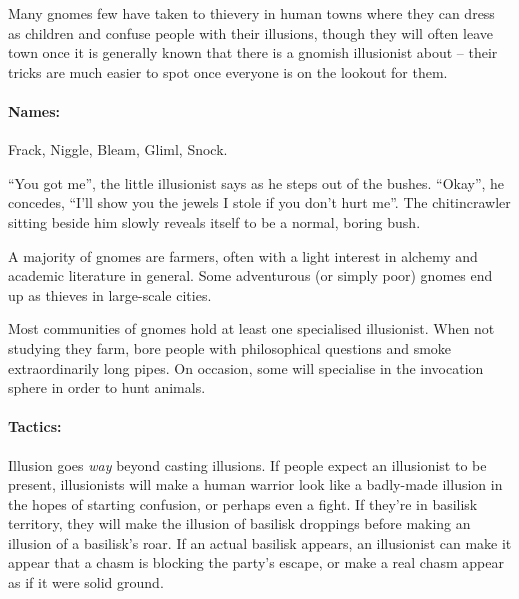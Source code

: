 \begin{multicols}{2}
Many gnomes few have taken to thievery in human towns where they can dress as children and confuse people with their illusions, though they will often leave town once it is generally known that there is a gnomish illusionist about -- their tricks are much easier to spot once everyone is on the lookout for them.

\paragraph{Names:} Frack, Niggle, Bleam, Gliml, Snock.

\begin{boxtext}

	``You got me'', the little illusionist says as he steps out of the bushes.
	``Okay'', he concedes, ``I'll show you the jewels I stole if you don't hurt me''.
	The chitincrawler sitting beside him slowly reveals itself to be a normal, boring bush.

\end{boxtext}

\label{gnomish_citizen}

A majority of gnomes are farmers, often with a light interest in alchemy and academic literature in general.  Some adventurous (or simply poor) gnomes end up as thieves in large-scale cities.


\label{gnomish_illusionist}

Most communities of gnomes hold at least one specialised illusionist.  When not studying they farm, bore people with philosophical questions and smoke extraordinarily long pipes.  On occasion, some will specialise in the invocation sphere in order to hunt animals.


\paragraph{Tactics:} Illusion goes \emph{way} beyond casting illusions.
If people expect an illusionist to be present, illusionists will make a human warrior look like a badly-made illusion in the hopes of starting confusion, or perhaps even a fight.
If they're in basilisk territory, they will make the illusion of basilisk droppings before making an illusion of a basilisk's roar.
If an actual basilisk appears, an illusionist can make it appear that a chasm is blocking the party's escape, or make a real chasm appear as if it were solid ground.


\end{multicols}
